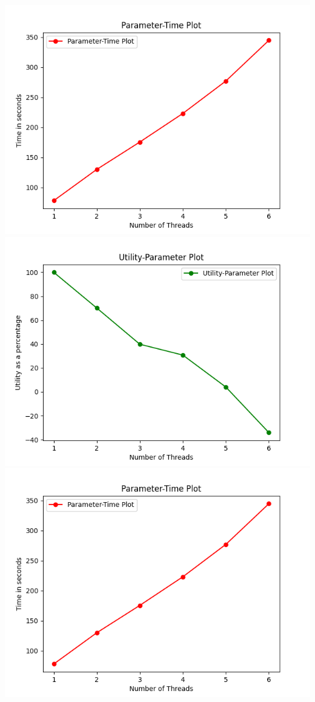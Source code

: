 \documentclass{article} %
\begin{document}
\begin{center}
    \includegraphics[scale = 0.8]{out_images/method_3_time.png}
    \\\includegraphics[scale = 0.8]{out_images/method_3_utility_param.png}
    \\\includegraphics[scale = 0.8]{out_images/method_3_time.png}
\end{center}
\end{document}
